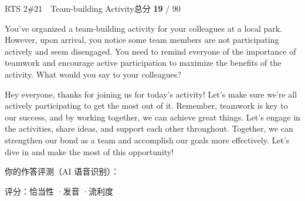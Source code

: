 \begin{qblock}{RTS 2\quad \#21\ \ Team-building Activity}{总分 \textcolor{cAccent}{\bfseries 19} / 90}
\begin{promptbox}
You've organized a team-building activity for your colleagues at a local park. However, upon arrival, you notice some team members are not participating actively and seem disengaged. You need to remind everyone of the importance of teamwork and encourage active participation to maximize the benefits of the activity. What would you say to your colleagues?
\end{promptbox}
\begin{modelbox}
Hey everyone, thanks for joining us for today's activity! Let's make sure we're all actively participating to get the most out of it. Remember, teamwork is key to our success, and by working together, we can achieve great things. Let's engage in the activities, share ideas, and support each other throughout. Together, we can strengthen our bond as a team and accomplish our goals more effectively. Let's dive in and make the most of this opportunity!
\end{modelbox}
\smallskip\par{\footnotesize\color{gray}你的作答评测（AI 语音识别）：}
\begin{asrbox}
                              
\end{asrbox}
{\small 评分：恰当性 \quad·\quad 发音 \quad·\quad 流利度 }
\end{qblock}

